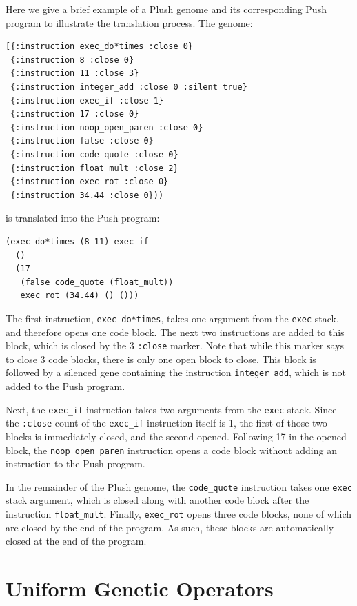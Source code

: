 \documentclass[graybox]{svmult}
\begin{document}
Here we give a brief example of a Plush genome and its corresponding Push program to illustrate the translation process. The genome:
\begin{verbatim}
[{:instruction exec_do*times :close 0}
 {:instruction 8 :close 0}
 {:instruction 11 :close 3}
 {:instruction integer_add :close 0 :silent true}
 {:instruction exec_if :close 1}
 {:instruction 17 :close 0}
 {:instruction noop_open_paren :close 0}
 {:instruction false :close 0}
 {:instruction code_quote :close 0}
 {:instruction float_mult :close 2}
 {:instruction exec_rot :close 0}
 {:instruction 34.44 :close 0}))
\end{verbatim}
is translated into the Push program:
\begin{verbatim}
(exec_do*times (8 11) exec_if
  ()
  (17
   (false code_quote (float_mult))
   exec_rot (34.44) () ()))
\end{verbatim}
The first instruction, \texttt{exec\_do*times}, takes one argument from the \texttt{exec} stack, and therefore opens one code block. The next two instructions are added to this block, which is closed by the 3 \texttt{:close} marker. Note that while this marker says to close 3 code blocks, there is only one open block to close. This block is followed by a silenced gene containing the instruction \texttt{integer\_add}, which is not added to the Push program.

Next, the \texttt{exec\_if} instruction takes two arguments from the \texttt{exec} stack. Since the \texttt{:close} count of the \texttt{exec\_if} instruction itself is 1, the first of those two blocks is immediately closed, and the second opened. Following 17 in the opened block, the \texttt{noop\_open\_paren} instruction opens a code block without adding an instruction to the Push program.

In the remainder of the Plush genome, the \texttt{code\_quote} instruction takes one \texttt{exec} stack argument, which is closed along with another code block after the instruction \texttt{float\_mult}. Finally, \texttt{exec\_rot} opens three code blocks, none of which are closed by the end of the program. As such, these blocks are automatically closed at the end of the program.


\section{Uniform Genetic Operators}
\label{section:genetic-operators}
\end{document}
